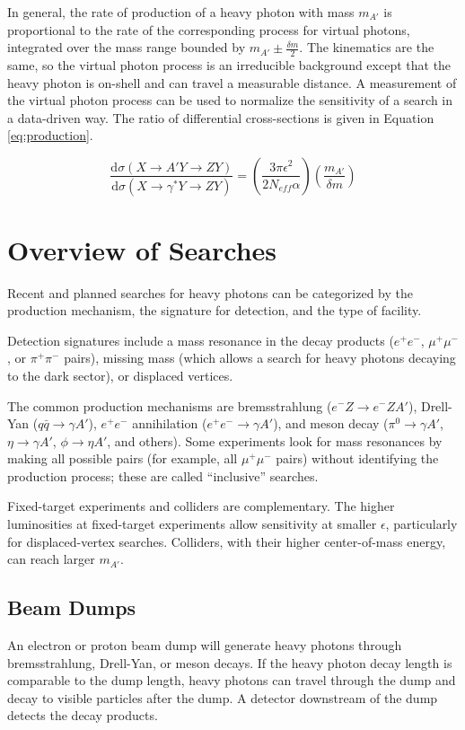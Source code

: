 In general, the rate of production of a heavy photon with mass $m_{A'}$ is proportional to the rate of the corresponding process for virtual photons, integrated over the mass range bounded by $m_{A'}\pm \frac{\delta m}{2}$.
The kinematics are the same, so the virtual photon process is an irreducible background except that the heavy photon is on-shell and can travel a measurable distance.
A measurement of the virtual photon process can be used to normalize the sensitivity of a search in a data-driven way.
The ratio of differential cross-sections is given in Equation \ref{eq:production}.

\begin{equation}
    \frac{\mathrm{d}\sigma(X \to A' Y \to Z Y)}{\mathrm{d}\sigma(X \to \gamma^* Y \to Z Y)} = \left(\frac{3\pi\epsilon^2}{2N_{eff} \alpha} \right) \left(\frac{m_{A'}}{\delta m} \right)
    \label{eq:production}
\end{equation}

\section{Overview of Searches}
Recent and planned searches for heavy photons can be categorized by the production mechanism, the signature for detection, and the type of facility.

Detection signatures include a mass resonance in the decay products ($e^+e^-$, $\mu^+\mu^-$, or $\pi^+\pi^-$ pairs), missing mass (which allows a search for heavy photons decaying to the dark sector), or displaced vertices.

The common production mechanisms are bremsstrahlung ($e^- Z \to e^- Z A'$), Drell-Yan ($q \bar{q} \to \gamma A'$), $e^+e^-$ annihilation ($e^+e^- \to \gamma A'$), and meson decay ($\pi^0 \to \gamma A'$, $\eta \to \gamma A'$, $\phi \to \eta A'$, and others).
Some experiments look for mass resonances by making all possible pairs (for example, all $\mu^+\mu^-$ pairs) without identifying the production process; these are called ``inclusive'' searches.

Fixed-target experiments and colliders are complementary.
The higher luminosities at fixed-target experiments allow sensitivity at smaller $\epsilon$, particularly for displaced-vertex searches.
Colliders, with their higher center-of-mass energy, can reach larger $m_{A'}$.

\subsection{Beam Dumps}
An electron or proton beam dump will generate heavy photons through bremsstrahlung, Drell-Yan, or meson decays.
If the heavy photon decay length is comparable to the dump length, heavy photons can travel through the dump and decay to visible particles after the dump.
A detector downstream of the dump detects the decay products.


